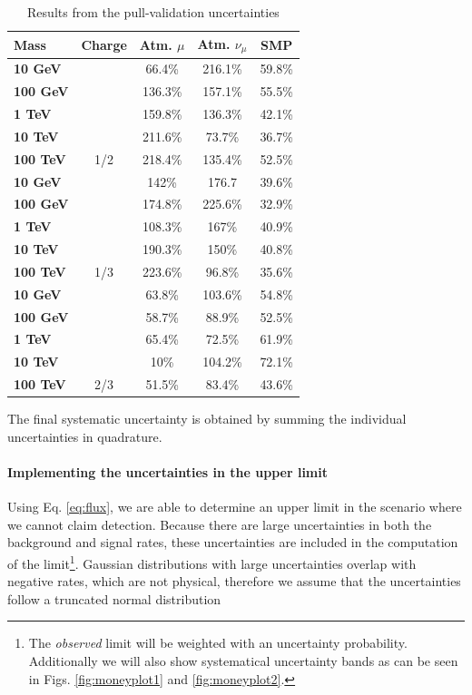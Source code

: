 \begin{table}[]
\centering
\caption{Results from the pull-validation uncertainties}
\label{tab:pvuncertainties}
\begin{tabular}{|l |c|c|c|c|}
\hline
\cellcolor[HTML]{F1A91E}Mass & \cellcolor[HTML]{F1A91E}Charge & \cellcolor[HTML]{F1A91E}Atm. $\mu$ & \cellcolor[HTML]{F1A91E}Atm. $\nu_\mu$ & \cellcolor[HTML]{F1A91E}SMP \\ \hline
\textbf{10 GeV} &  & 66.4\% & 216.1\% & 59.8\% \\ \cline{3-5}
\textbf{100 GeV} &  & 136.3\% & 157.1\% & 55.5\% \\ \cline{3-5}
\textbf{1 TeV} &  & 159.8\% & 136.3\% & 42.1\% \\ \cline{3-5}
\textbf{10 TeV} &  & 211.6\% & 73.7\% & 36.7\% \\ \cline{3-5}
\textbf{100 TeV} & \multirow{-5}{*}{1/2} & 218.4\% & 135.4\% & 52.5\% \\ \hline
\textbf{10 GeV} & & 142\% & 176.7 & 39.6\% \\ \cline{3-5}
\textbf{100 GeV} & & 174.8\% & 225.6\% & 32.9\% \\ \cline{3-5}
\textbf{1 TeV} & & 108.3\% & 167\% & 40.9\% \\ \cline{3-5}
\textbf{10 TeV} & & 190.3\% & 150\% & 40.8\% \\\cline{3-5}
\textbf{100 TeV} & \multirow{-5}{*}{1/3} & 223.6\% & 96.8\% & 35.6\% \\ \hline
\textbf{10 GeV} & & 63.8\% & 103.6\% & 54.8\% \\ \cline{3-5}
\textbf{100 GeV} & & 58.7\% & 88.9\% & 52.5\% \\\cline{3-5}
\textbf{1 TeV} & & 65.4\% & 72.5\% & 61.9\% \\ \cline{3-5}
\textbf{10 TeV} & & 10\% & 104.2\% & 72.1\% \\ \cline{3-5}
\textbf{100 TeV} & \multirow{-5}{*}{2/3} & 51.5\% & 83.4\% & 43.6\% \\ \hline
\end{tabular}
\end{table}

\noindent The final systematic uncertainty is obtained by summing the individual uncertainties in quadrature.

\paragraph{Implementing the uncertainties in the upper limit}
Using Eq. \ref{eq:flux}, we are able to determine an upper limit in the scenario where we cannot claim detection. Because there are large uncertainties in both the background and signal rates, these uncertainties are included in the computation of the limit\footnote{The \textit{observed} limit will be weighted with an uncertainty probability. Additionally we will also show systematical uncertainty bands as can be seen in Figs. \ref{fig:moneyplot1} and \ref{fig:moneyplot2}.}. Gaussian distributions with large uncertainties overlap with negative rates, which are not physical, therefore we assume that the uncertainties follow a truncated normal distribution 

